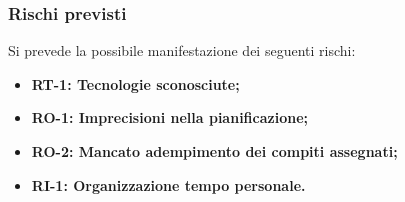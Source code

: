 \documentclass[a4paper,12pt]{article}
\begin{document}
        \subsubsection{Rischi previsti}{
            Si prevede la possibile manifestazione dei seguenti rischi:
            \begin{itemize}
                \item \textbf{RT-1: Tecnologie sconosciute;}
                \item \textbf{RO-1: Imprecisioni nella pianificazione;}
                \item \textbf{RO-2: Mancato adempimento dei compiti assegnati;}
                \item \textbf{RI-1: Organizzazione tempo personale.}
            \end{itemize}
        }

    
\end{document}
